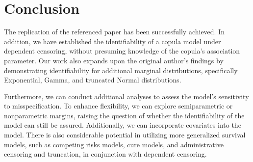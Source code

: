 \section{Conclusion}

\normalsize{
The replication of the referenced paper\cite{10.1093/biomet/asac067} has been successfully achieved. In addition, we have established the identifiability of a copula model under dependent censoring, without presuming knowledge of the copula’s association parameter. Our work also expands upon the original author’s findings by demonstrating identifiability for additional marginal distributions, specifically Exponential, Gamma, and truncated Normal distributions.

Furthermore, we can conduct additional analyses to assess the model’s sensitivity to misspecification. To enhance flexibility, we can explore semiparametric or nonparametric margins, raising the question of whether the identifiability of the model can still be assured. Additionally, we can incorporate covariates into the model. There is also considerable potential in utilizing more generalized survival models, such as competing risks models, cure models, and administrative censoring and truncation, in conjunction with dependent censoring.
}\\